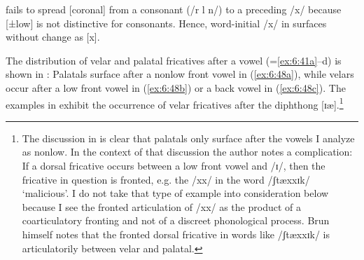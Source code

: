  fails to spread [coronal] from a consonant (/r l n/) to a preceding /x/ because [±low] is not distinctive for consonants. Hence, word-initial /x/ in  surfaces without change as [x].

The distribution of velar and palatal fricatives after a vowel (=\ref{ex:6:41a}--d) is shown in : Palatals surface after a nonlow front vowel in (\ref{ex:6:48a}), while velars occur after a low front vowel in (\ref{ex:6:48b}) or a back vowel in (\ref{ex:6:48c}). The examples in  exhibit the occurrence of velar fricatives after the diphthong [ɪæ].\footnote{\label{fn:6:10}The discussion in \citet[114]{Brun1918} is clear that palatals only surface after the vowels I analyze as nonlow. In the context of that discussion the author notes a complication: If a dorsal fricative occurs between a low front vowel and /ɪ/, then the fricative in question is fronted, e.g. the /xx/ in the word /ʃtæxxɪk/ ‘malicious’. I do not take that type of example into consideration below because I see the fronted articulation of /xx/ as the product of a coarticulatory fronting and not of a discreet phonological process. Brun himself notes that the fronted dorsal fricative in words like /ʃtæxxɪk/ is articulatorily between velar and palatal.}


